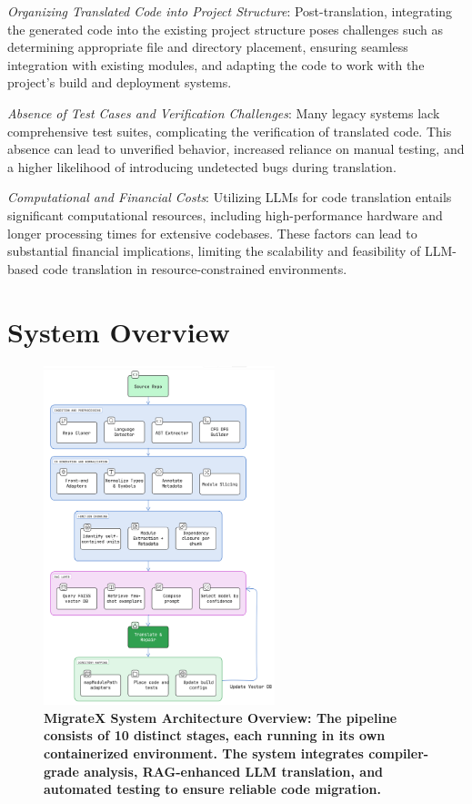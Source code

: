 \documentclass[twocolumn]{article}
\begin{document}
   \textit{Organizing Translated Code into Project Structure}: Post-translation, integrating the generated code into the existing project structure poses challenges such as determining appropriate file and directory placement, ensuring seamless integration with existing modules, and adapting the code to work with the project's build and deployment systems.

   \textit{Absence of Test Cases and Verification Challenges}: Many legacy systems lack comprehensive test suites, complicating the verification of translated code. This absence can lead to unverified behavior, increased reliance on manual testing, and a higher likelihood of introducing undetected bugs during translation.

   \textit{Computational and Financial Costs}: Utilizing LLMs for code translation entails significant computational resources, including high-performance hardware and longer processing times for extensive codebases. These factors can lead to substantial financial implications, limiting the scalability and feasibility of LLM-based code translation in resource-constrained environments.

\section{System Overview}

\begin{figure}[t]
    \centering
    \includegraphics[width=0.6\textwidth]{figures/system_overview_1.png}
    \caption{\textbf{MigrateX System Architecture Overview: The pipeline consists of 10 distinct stages, each running in its own containerized environment. The system integrates compiler-grade analysis, RAG-enhanced LLM translation, and automated testing to ensure reliable code migration.}}
    \label{fig:system-overview}
\end{figure}
\end{document}
